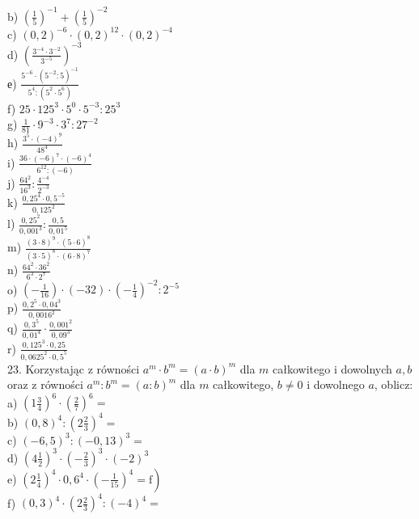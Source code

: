 \documentclass[10pt]{article}
\begin{document}
b) \(\left(\frac{1}{5}\right)^{-1}+\left(\frac{1}{5}\right)^{-2}\)\\
c) \((0,2)^{-6} \cdot(0,2)^{12} \cdot(0,2)^{-4}\)\\
d) \(\left(\frac{3^{-4} \cdot 3^{-2}}{3^{-5}}\right)^{-3}\)\\
е) \(\frac{5^{-6} \cdot\left(5^{-2}: 5\right)^{-1}}{5^{4}:\left(5^{2} \cdot 5^{6}\right)}\)\\
f) \(25 \cdot 125^{3} \cdot 5^{0} \cdot 5^{-3}: 25^{3}\)\\
g) \(\frac{1}{81} \cdot 9^{-3} \cdot 3^{7}: 27^{-2}\)\\
h) \(\frac{3^{5} \cdot(-4)^{9}}{48^{4}}\)\\
i) \(\frac{36 \cdot(-6)^{7} \cdot(-6)^{4}}{6^{12}:(-6)}\)\\
j) \(\frac{64^{2}}{16^{3}}: \frac{4^{-4}}{2^{-3}}\)\\
k) \(\frac{0,25^{4} \cdot 0,5^{-5}}{0,125^{2}}\)\\
l) \(\frac{0,25^{2}}{0,001^{3}}: \frac{0,5}{0,01^{5}}\)\\
m) \(\frac{(3 \cdot 8)^{9} \cdot(5 \cdot 6)^{8}}{(3 \cdot 5)^{8} \cdot(6 \cdot 8)^{7}}\)\\
n) \(\frac{64^{2} \cdot 36^{2}}{6^{3} \cdot 2^{7}}\)\\
o) \(\left(-\frac{1}{16}\right) \cdot(-32) \cdot\left(-\frac{1}{4}\right)^{-2}: 2^{-5}\)\\
p) \(\frac{0,2^{5} \cdot 0,04^{3}}{0,0016^{2}}\)\\
q) \(\frac{0,3^{5}}{0,01^{4}} \cdot \frac{0,001^{2}}{0,09^{3}}\)\\
r) \(\frac{0,125^{3} \cdot 0,25}{0,0625^{2} \cdot 0,5^{5}}\)\\
23. Korzystając z równości \(a^{m} \cdot b^{m}=(a \cdot b)^{m}\) dla \(m\) całkowitego i dowolnych \(a, b\) oraz z równości \(a^{m}: b^{m}=(a: b)^{m}\) dla \(m\) całkowitego, \(b \neq 0\) i dowolnego \(a\), oblicz:\\
a) \(\left(1 \frac{3}{4}\right)^{6} \cdot\left(\frac{2}{7}\right)^{6}=\)\\
b) \((0,8)^{4}:\left(2 \frac{2}{3}\right)^{4}=\)\\
c) \((-6,5)^{3}:(-0,13)^{3}=\)\\
d) \(\left(4 \frac{1}{2}\right)^{3} \cdot\left(-\frac{2}{3}\right)^{3} \cdot(-2)^{3}\)\\
e) \(\left.\left(2 \frac{1}{4}\right)^{4} \cdot 0,6^{4} \cdot\left(-\frac{1}{15}\right)^{4}=\mathrm{f}\right)\)\\
f) \((0,3)^{4} \cdot\left(2 \frac{2}{3}\right)^{4}:(-4)^{4}=\)\\
\end{document}

